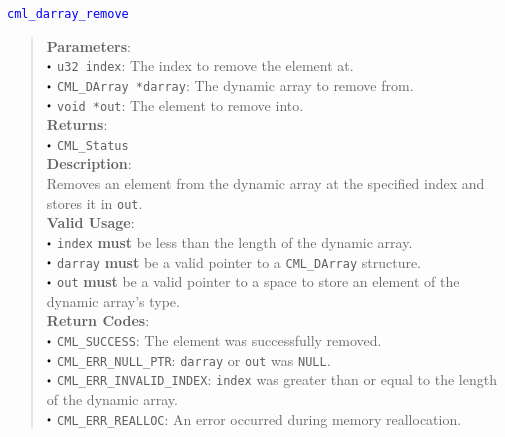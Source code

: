 \documentclass[a4paper,oneside,8pt]{extarticle}
\newcommand{\function}[1]{
  \noindent\textcolor{blue}{\texttt{#1}}
  \vspace{-0.3em}
}
\renewcommand{\dot}{\raisebox{0.3ex}{\scalebox{0.6}{$\bullet$}}}
\theoremstyle{definition}
\begin{document}
\function{cml\_darray\_remove}
\begin{quote}
  \textbf{Parameters}: \\
  $\dot$ \texttt{u32 index}: The index to remove the element at. \\
  $\dot$ \texttt{CML\_DArray *darray}: The dynamic array to remove from. \\
  $\dot$ \texttt{void *out}: The element to remove into. \\
  \textbf{Returns}: \\
  $\dot$ \texttt{CML\_Status} \\

  \vspace{-0.75em}
  \textbf{Description}: \\
  Removes an element from the dynamic array at the specified index and stores it in \texttt{out}. \\

  \vspace{-0.75em}
  \textbf{Valid Usage}: \\
  $\dot$ \texttt{index} \textbf{must} be less than the length of the dynamic array. \\
  $\dot$ \texttt{darray} \textbf{must} be a valid pointer to a \texttt{CML\_DArray} structure. \\
  $\dot$ \texttt{out} \textbf{must} be a valid pointer to a space to store an element of the dynamic array's type. \\

  \vspace{-0.75em}
  \textbf{Return Codes}: \\
  $\dot$ \texttt{CML\_SUCCESS}: The element was successfully removed. \\
  $\dot$ \texttt{CML\_ERR\_NULL\_PTR}: \texttt{darray} or \texttt{out} was \texttt{NULL}. \\
  $\dot$ \texttt{CML\_ERR\_INVALID\_INDEX}: \texttt{index} was greater than or equal to the length of the dynamic array. \\
  $\dot$ \texttt{CML\_ERR\_REALLOC}: An error occurred during memory reallocation. \\
\end{quote}
\end{document}

